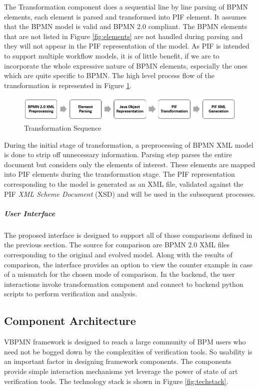 \documentclass{article}
\begin{document}
The Transformation component does a sequential line by line parsing of BPMN elements, each element is parsed and transformed into PIF element. It assumes that the BPMN model is valid and BPMN 2.0 compliant. The BPMN elements that are not listed in Figure \ref{fig:elements} are not handled during parsing and they will not appear in the PIF representation of the model. As PIF is intended to support multiple workflow models, it is of little benefit, if we are to incorporate the whole expressive nature of BPMN elements, especially the ones which are quite specific to BPMN. The high level process flow of the transformation is represented in Figure \ref{fig:transformation}.

\begin{figure}[ht]
\center
\includegraphics[scale =0.58]{Transformation.png}
\caption{Transformation Sequence}
\label{fig:transformation}
\end{figure}

During the initial stage of transformation, a preprocessing of BPMN XML model is done to strip off unnecessary information. Parsing step parses the entire document but considers only the elements of interest. These elements are mapped into PIF elements during the transformation stage. The PIF representation corresponding to the model is generated as an XML file, validated against the PIF \textit{XML Scheme Document} (XSD) and will be used in the subsequent processes. 

\subparagraph{User Interface}
The proposed interface is designed to support all of those comparisons defined in the previous section. The source for comparison are BPMN 2.0 XML files corresponding to the original and evolved model. Along with the results of comparison, the interface provides an option to view the counter example in case of a mismatch for the chosen mode of comparison. In the backend, the user interactions invoke transformation component and connect to backend python scripts to perform verification and analysis.

\subsection{Component Architecture}

VBPMN framework is designed to reach a large community of BPM users who need not be bogged down by the complexities of verification tools. So usability is an important factor in designing framework components. The components provide simple interaction mechanisms yet leverage the power of state of art verification tools. The technology stack is shown in Figure \ref{fig:techstack}.
\end{document}
